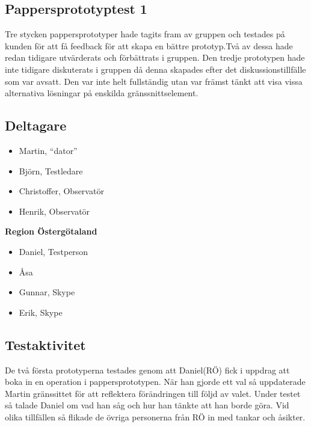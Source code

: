\documentclass[a4paper,10pt]{article}
\begin{document}
\subsection{Pappersprototyptest 1}
Tre stycken pappersprototyper hade tagits fram av gruppen och testades på kunden för att få feedback för att skapa en bättre prototyp.Två av dessa hade redan tidigare utvärderats och förbättrats i gruppen. Den tredje prototypen hade inte tidigare diskuterats i gruppen då denna skapades efter det diskussionstillfälle som var avsatt. Den var inte helt fullständig utan var främst tänkt att visa vissa alternativa lösningar på enskilda gränssnittselement.
\subsection{Deltagare}
\begin{itemize}
\item Martin, “dator”
\item Björn, Testledare
\item Christoffer, Observatör
\item Henrik, Observatör
\end{itemize}

\textbf{Region Östergötaland}
\begin{itemize}
\item Daniel, Testperson
\item Åsa
\item Gunnar, Skype
\item Erik, Skype
\end{itemize}
\subsection{Testaktivitet}
De två första prototyperna testades genom att Daniel(RÖ) fick i uppdrag att boka in en operation i pappersprototypen. När han gjorde ett val så uppdaterade Martin gränssittet för att reflektera förändringen till följd av valet. Under testet så talade Daniel om vad han såg och hur han tänkte att han borde göra. Vid olika tillfällen så flikade de övriga personerna från RÖ in med tankar och åsikter.
\end{document}
